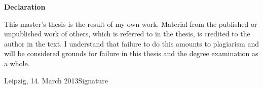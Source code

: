 \documentclass[%
  parskip=half,
  ]{scrreprt} %
\begin{document}
\clearpage
\pagestyle{empty}
\vspace*{1cm}
\begin{center}
\textbf{\sffamily Declaration}
\end{center}
\vspace*{0.5cm}
This master's thesis is the result of my own work. Material from the published or unpublished work of others, which is referred to in the thesis, is credited to the author in the text. I understand that failure to do this amounts to plagiarism and will be considered grounds for failure in this thesis and the degree examination as a whole.

\vspace{2cm}
\noindent
Leipzig, 14. March 2013\hfill Signature
\end{document}
